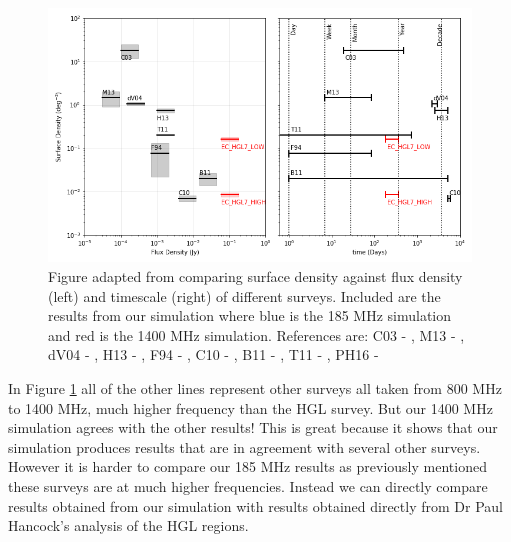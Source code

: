 \documentclass[a4paper, 10pt]{article}
\begin{document}
\begin{figure}[H]
\begin{center}
  \includegraphics[width=\textwidth]{lognlogs2.png}
  \caption{Figure adapted from \citet{PDS_PJH} comparing surface density against flux density (left) and timescale (right) of different surveys. Included are the results from our simulation where blue is the 185 MHz simulation and red is the 1400 MHz simulation.  References are: C03 - \citet{Carilli03}, M13 - \citet{Mooley13}, dV04 - \citet{deVires04}, H13 - \citet{Hodge13}, F94 - \citet{Frail94}, C10 - \citet{Croft10}, B11 - \citet{Bannister11}, T11 - \citet{Thyag11}, PH16 - \citet{PDS_PJH}}
  \label{fig:comp}
\end{center}
\end{figure}
In Figure \ref{fig:comp} all of the other lines represent other surveys all taken from 800 MHz to 1400 MHz, much higher frequency than the HGL survey. But our 1400 MHz simulation agrees with the other results! This is great because it shows that our simulation produces results that are in agreement with several other surveys. However it is harder to compare our 185 MHz results as previously mentioned these surveys are at much higher frequencies. Instead we can directly compare results obtained from our simulation with results obtained directly from Dr Paul Hancock's analysis of the HGL regions.\\
\end{document}
